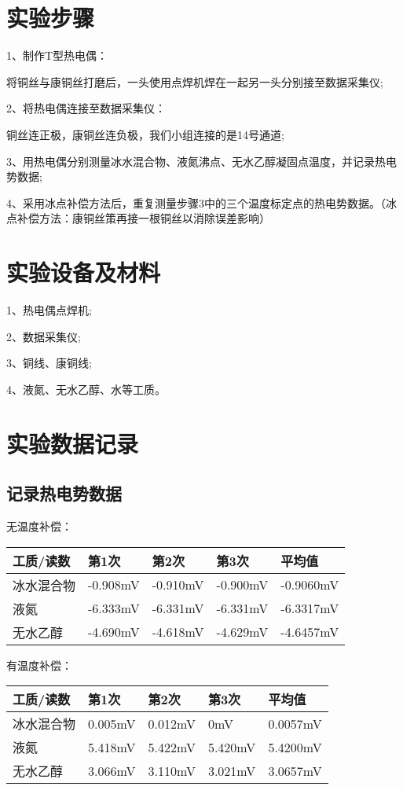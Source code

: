 \documentclass[UTF8,a4paper,10pt]{ctexart}
\begin{document}
	\section{实验步骤}
	
	1、制作T型热电偶：
	
	将铜丝与康铜丝打磨后，一头使用点焊机焊在一起另一头分别接至数据采集仪;
	
	2、将热电偶连接至数据采集仪：
	
	铜丝连正极，康铜丝连负极，我们小组连接的是14号通道;
	
	3、用热电偶分别测量冰水混合物、液氮沸点、无水乙醇凝固点温度，并记录热电势数据;
	
	4、采用冰点补偿方法后，重复测量步骤3中的三个温度标定点的热电势数据。（冰点补偿方法：康铜丝策再接一根铜丝以消除误差影响）
	
	\section{实验设备及材料}
	
	1、热电偶点焊机;
	
	2、数据采集仪;
	
	3、铜线、康铜线;
	
	4、液氮、无水乙醇、水等工质。
	
	\section{实验数据记录}
	
	\subsection{记录热电势数据}
	
	无温度补偿：
	\begin{table}[h]
		\centering
		\begin{tabular}{|l|l|l|l|l|}
			\hline
			工质/读数 & 第1次 & 第2次 & 第3次 & 平均值 \\ \hline
			冰水混合物 & -0.908mV & -0.910mV & -0.900mV & -0.9060mV \\ \hline
			液氮 & -6.333mV & -6.331mV & -6.331mV & -6.3317mV \\ \hline
			无水乙醇 & -4.690mV & -4.618mV & -4.629mV & -4.6457mV \\ \hline
		\end{tabular}
	\end{table}

	有温度补偿：
	
	\begin{table}[h]
		\centering
		\begin{tabular}{|l|l|l|l|l|}
			\hline
			工质/读数 & 第1次 & 第2次 & 第3次 & 平均值 \\ \hline
			冰水混合物 & 0.005mV & 0.012mV & 0mV & 0.0057mV \\ \hline
			液氮 & 5.418mV & 5.422mV & 5.420mV & 5.4200mV \\ \hline
			无水乙醇 & 3.066mV & 3.110mV & 3.021mV & 3.0657mV \\ \hline
		\end{tabular}
	\end{table}
\end{document}
